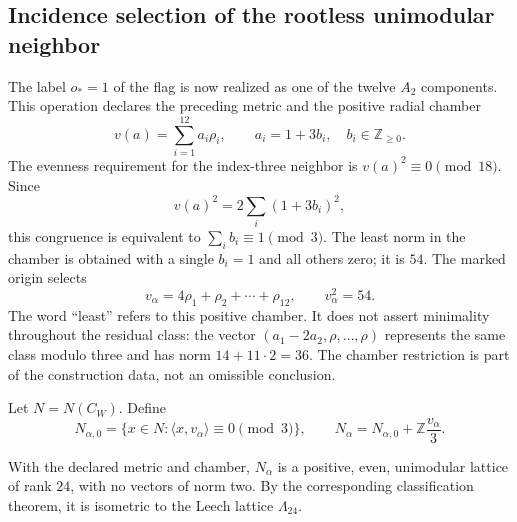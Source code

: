 \subsection{Incidence selection of the rootless unimodular neighbor}
\label{exc:leech}

The label $o_*=1$ of the flag is now realized as one of the
twelve $A_2$ components. This operation declares the preceding metric and
the positive radial chamber
\[
 v(a)=\sum_{i=1}^{12}a_i\rho_i,
 \qquad a_i=1+3b_i,\quad b_i\in\mathbb Z_{\geq0}.
\]
The evenness requirement for the index-three neighbor is
$v(a)^2\equiv0\pmod{18}$. Since
\[
 v(a)^2=2\sum_i(1+3b_i)^2,
\]
this congruence is equivalent to $\sum_i b_i\equiv1\pmod3$. The least
norm in the chamber is obtained with a single $b_i=1$ and
all others zero; it is $54$. The marked origin selects
\begin{equation}
 v_\alpha=4\rho_1+\rho_2+\cdots+\rho_{12},
 \qquad v_\alpha^2=54.
 \label{exc:vector}
\end{equation}
The word ``least'' refers to this positive chamber. It does not assert
minimality throughout the residual class: the vector
$(a_1-2a_2,\rho,\ldots,\rho)$ represents the same class modulo three
and has norm $14+11\cdot2=36$. The chamber restriction is part
of the construction data, not an omissible conclusion.

Let $N=N(C_W)$. Define
\begin{equation}
 N_{\alpha,0}=\{x\in N:\langle x,v_\alpha\rangle\equiv0\pmod3\},
 \qquad
 N_\alpha=N_{\alpha,0}+\mathbb Z\frac{v_\alpha}{3}.
 \label{exc:vecino}
\end{equation}

\begin{theorem}
\label{exc:teorema-leech}
With the declared metric and chamber, $N_\alpha$ is a positive, even,
unimodular lattice of rank $24$, with no vectors of norm two.
By the corresponding classification theorem, it is isometric to the
Leech lattice $\Lambda_{24}$.
\end{theorem}

